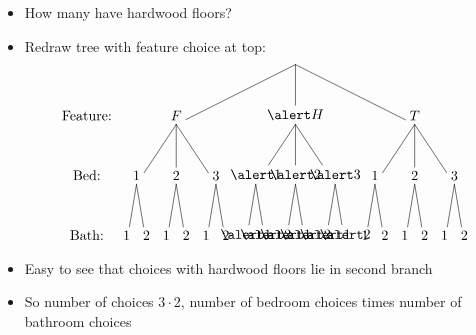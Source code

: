 \documentclass{beamer}
\theoremstyle{definition}
\begin{document}
\begin{frame}
\begin{itemize}
\item How many have hardwood floors?
\item Redraw tree with feature choice at top:
\[\begin{xy}<.5cm,0cm>:
(8.5,0)="0";
(2.5,-3)="1";
(8.5,-3)="2";
(14.5,-3)="3";
"0";"1"*+!D{F}**\dir{-};
"0";"2"*+!D{\alert H}**\dir{-};
"0";"3"*+!D{T}**\dir{-};
(.5,-6)="11";
(2.5,-6)="12";
(4.5,-6)="13";
(6.5,-6)="21";
(8.5,-6)="22";
(10.5,-6)="23";
(12.5,-6)="31";
(14.5,-6)="32";
(16.5,-6)="33";
"1";"11"*+!D{1}**\dir{-};
"1";"12"*+!D{2}**\dir{-};
"1";"13"*+!D{3}**\dir{-};
"2";"21"*+!D{\alert 1}**\dir{-};
"2";"22"*+!D{\alert 2}**\dir{-};
"2";"23"*+!D{\alert 3}**\dir{-};
"3";"31"*+!D{1}**\dir{-};
"3";"32"*+!D{2}**\dir{-};
"3";"33"*+!D{3}**\dir{-};
"11";(0,-9)*+!D{1}**\dir{-};
"11";(1,-9)*+!D{2}**\dir{-};
"12";(2,-9)*+!D{1}**\dir{-};
"12";(3,-9)*+!D{2}**\dir{-};
"13";(4,-9)*+!D{1}**\dir{-};
"13";(5,-9)*+!D{2}**\dir{-};
"21";(6,-9)*+!D{\alert 1}**\dir{-};
"21";(7,-9)*+!D{\alert 2}**\dir{-};
"22";(8,-9)*+!D{\alert 1}**\dir{-};
"22";(9,-9)*+!D{\alert 2}**\dir{-};
"23";(10,-9)*+!D{\alert 1}**\dir{-};
"23";(11,-9)*+!D{\alert 2}**\dir{-};
"31";(12,-9)*+!D{1}**\dir{-};
"31";(13,-9)*+!D{2}**\dir{-};
"32";(14,-9)*+!D{1}**\dir{-};
"32";(15,-9)*+!D{2}**\dir{-};
"33";(16,-9)*+!D{1}**\dir{-};
"33";(17,-9)*+!D{2}**\dir{-};
(-2,-3)*+!D{\text{Feature:}};
(-2,-6)*+!D{\text{Bed:}};
(-2,-9)*+!D{\text{Bath:}};
\end{xy}\]
\item Easy to see that choices with hardwood floors
lie in second branch
\item So number of choices $3\cdot 2$, number
of bedroom choices times number of bathroom choices
\end{itemize}
\end{frame}
\end{document}
